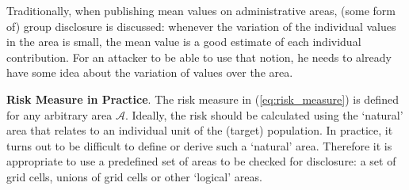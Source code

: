 Traditionally, when publishing mean values on administrative areas, (some
form of) group disclosure is discussed: whenever the variation of the individual
values in the area is small, the mean value is a good estimate of each individual
contribution. For an attacker to be able to use that notion, he needs to already have some
idea about the variation of values over the area.\bigskip

\textbf{Risk Measure in Practice}. The risk measure in (\ref{eq:risk_measure}) is defined for any arbitrary
area $\mathcal{A}$. Ideally, the risk should be calculated using the ‘natural’ area that relates
to an individual unit of the (target) population. In practice, it turns out to be
difficult to define or derive such a ‘natural’ area. Therefore it is appropriate to
use a predefined set of areas to be checked for disclosure: a set of grid cells,
unions of grid cells or other ‘logical’ areas.